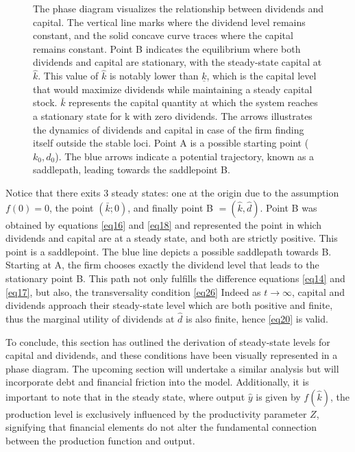\documentclass[12pt]{report}
\begin{document}
\begin{figure}
    \caption{The phase diagram visualizes the relationship between dividends and capital. The vertical line marks
    where the dividend level remains constant, and the solid concave curve traces where the capital remains constant.
    Point B indicates the equilibrium where both dividends and capital are stationary, with the steady-state capital at
    \( \hat{k} \). This value of \( \hat{k} \) is notably lower than \( \underline{k} \), which is the capital level
    that would maximize dividends while maintaining a steady capital stock. \( \bar{k} \) represents the capital
    quantity at which the system reaches a stationary state for k with zero dividends. The arrows illustrates the dynamics of dividends and capital in case of the firm finding itself outside the stable
    loci. Point A is a possible starting point (\(k_0,d_0\)). 
    The blue arrows indicate a potential trajectory, known as a saddlepath, leading towards the saddlepoint B. 
    }
    \label{fig:ph_d_nodebt}
\end{figure}
Notice that there exits 3 steady states: one at the origin due to the assumption \(f(0)=0\), the point \((\bar{k};0)\),
and finally point B \(=(\hat{k},\hat{d})\). Point B was obtained by equations \ref{eq16} and \ref{eq18} and represented the point in
which dividends and capital are at a steady state, and both are strictly positive. This point is a saddlepoint.
The blue line depicts a possible saddlepath towards B. Starting at A, the firm chooses exactly the dividend level that
leads to the stationary point B. This path not only fulfills the difference equations \ref{eq14} and \ref{eq17}, but
also, the transversality condition \ref{eq26}
Indeed as \(t \rightarrow \infty\), capital and dividends approach their steady-state level which are both positive and
finite, thus the marginal utility of dividends at \(\hat{d}\) is also finite, hence \ref{eq20} is valid.

To conclude, this section has outlined the derivation of steady-state levels for capital and dividends, and these
conditions have been visually represented in a phase diagram. The upcoming section will undertake a similar analysis but
will incorporate debt and financial friction into the model. Additionally, it is important to note that in the steady
state, where output \(\hat{y}\) is given by \(f(\hat{k})\), the production level is exclusively influenced by the
productivity parameter \(Z\), signifying that financial elements do not alter the fundamental connection between the
production function and output. 
\end{document}
